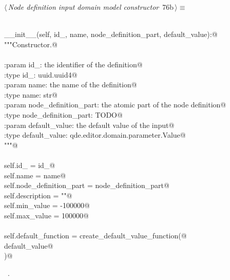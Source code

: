 \documentclass[
    a4paper,      %
    10pt,         %
    openright,    %
    notitlepage,  %
    parskip=half, %
]{scrreprt}       %
\theoremstyle{definition}                    %
\begin{document}
\begin{flushleft} \small
\begin{minipage}{\linewidth}\label{scrap125}\raggedright\small
{} $\langle\,${\itshape Node definition input domain model constructor}\nobreak\ {\footnotesize {76b}}$\,\rangle\equiv$
\vspace{-1exm}
\begin{list}{}{} \item
\mbox{}\lstinline@@\\
\mbox{}\lstinline@def __init__(self, id_, name, node_definition_part, default_value):@\\
\mbox{}\lstinline@    """Constructor.@\\
\mbox{}\lstinline@@\\
\mbox{}\lstinline@    :param id_: the identifier of the definition@\\
\mbox{}\lstinline@    :type  id_: uuid.uuid4@\\
\mbox{}\lstinline@    :param name: the name of the definition@\\
\mbox{}\lstinline@    :type  name: str@\\
\mbox{}\lstinline@    :param node_definition_part: the atomic part of the node definition@\\
\mbox{}\lstinline@    :type node_definition_part: TODO@\\
\mbox{}\lstinline@    :param default_value: the default value of the input@\\
\mbox{}\lstinline@    :type default_value: qde.editor.domain.parameter.Value@\\
\mbox{}\lstinline@    """@\\
\mbox{}\lstinline@@\\
\mbox{}\lstinline@    self.id_                  = id_@\\
\mbox{}\lstinline@    self.name                 = name@\\
\mbox{}\lstinline@    self.node_definition_part = node_definition_part@\\
\mbox{}\lstinline@    self.description          = ""@\\
\mbox{}\lstinline@    self.min_value            = -100000@\\
\mbox{}\lstinline@    self.max_value            = 100000@\\
\mbox{}\lstinline@@\\
\mbox{}\lstinline@    self.default_function = create_default_value_function(@\\
\mbox{}\lstinline@        default_value@\\
\mbox{}\lstinline@    )@{\NWsep}
\end{list}
\vspace{-1.5ex}
\footnotesize
\begin{list}{}{\setlength{\itemsep}{-\parsep}\setlength{\itemindent}{-\leftmargin}}
\item \NWtxtMacroRefIn\ .

\item{}
\end{list}
\end{minipage}\vspace{4ex}
\end{flushleft}
\end{document}
